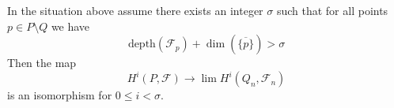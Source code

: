 %
\begin{proposition}
\label{proposition-lefschetz}
In the situation above assume there exists an integer $\sigma$ such that
for all points $p \in P \setminus Q$ we have
$$
\text{depth}(\mathcal{F}_p) + \dim(\overline{\{p\}}) > \sigma
$$
Then the map
$$
H^i(P, \mathcal{F}) \longrightarrow \lim H^i(Q_n, \mathcal{F}_n)
$$
is an isomorphism for $0 \leq i < \sigma$.
\end{proposition}

